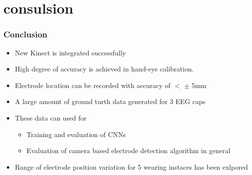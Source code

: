 \section{consulsion}
\begin{frame}
	\frametitle{Conclusion}
	\begin{itemize}
		\item New Kinect is integrated successfully
		\item High degree of accuracy is achieved in hand-eye calibration.
		\item Electrode location can be recorded with accuracy of $<$ $\pm$ 5mm
		\item A large amount of ground turth data generated for 3 EEG caps
		\item These data can used for 
		\begin{itemize}
			\item Training and evaluation of CNNs
			\item Evaluation of camera based electrode detection algorithm in general  
		\end{itemize}
		\item Range of electrode position variation for 5 wearing instaces has been exlpored
	\end{itemize}

\end{frame}